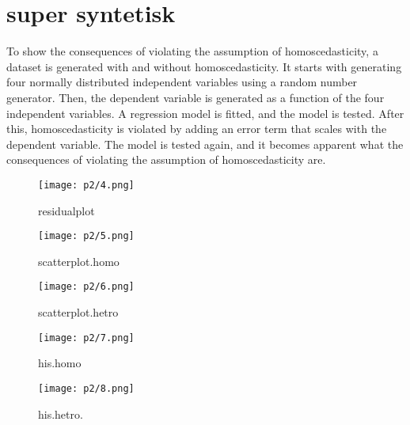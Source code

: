 \section{super syntetisk }

To show the consequences of violating the assumption of homoscedasticity, a dataset is generated with and without homoscedasticity. It starts with generating four normally distributed independent variables using a random number generator. Then, the dependent variable is generated as a function of the four independent variables. A regression model is fitted, and the model is tested. After this, homoscedasticity is violated by adding an error term that scales with the dependent variable. The model is tested again, and it becomes apparent what the consequences of violating the assumption of homoscedasticity are.





\begin{figure}[h] 
	\centering\texttt{[image: p2/4.png]}
	\caption{residualplot}
	\label{fig:j06}
\end{figure}

\begin{figure}[h] 
	\centering\texttt{[image: p2/5.png]}
	\caption{scatterplot.homo}
	\label{fig:j06}
\end{figure}

\begin{figure}[h] 
	\centering\texttt{[image: p2/6.png]}
	\caption{scatterplot.hetro}
	\label{fig:j06}
\end{figure}

\begin{figure}[h] 
	\centering\texttt{[image: p2/7.png]}
	\caption{his.homo}
	\label{fig:j06}
\end{figure}

\begin{figure}[h] 
	\centering
	\texttt{[image: p2/8.png]}
	\caption{his.hetro.}
	\label{fig:j06}
\end{figure}
